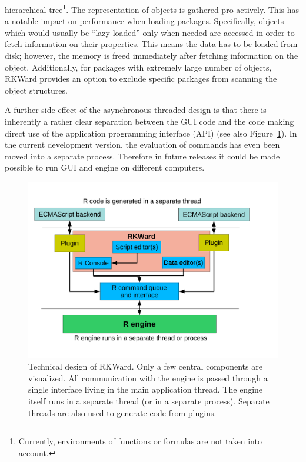 hierarchical tree\footnote{
    Currently, environments of functions or formulas are not taken into account.
}. The representation of  objects is gathered
pro-actively. This has a notable impact on performance when loading packages.
Specifically, objects which would usually be ``lazy loaded'' only when needed \citep[see][]{Ripley2004} are
accessed in order to fetch information on their properties. This means the data
has to be loaded from disk; however, the memory is freed immediately after fetching
information on the object. Additionally, for packages with extremely large number of objects, RKWard
provides an option to exclude specific packages from scanning the object structures.

A further side-effect of the asynchronous threaded design is that there is
inherently a rather clear separation between the GUI code and the code making direct use
of the  application programming interface (API) (see also Figure~\ref{fig:design_sketch}). 
In the current development version, the evaluation
of  commands has even been moved into a separate process. Therefore in future releases it could 
be made possible to run GUI and  engine on different computers.

\begin{figure}[htp]
 \centering
 \includegraphics{../figures/design_sketch.pdf}
 \caption{Technical design of RKWard. Only a few central components are visualized.
 All communication with the  engine is passed through a single interface living in the main application thread. The  engine itself
 runs in a separate thread (or in a separate process). 
 Separate threads are also used to generate  code from plugins.
}
 \label{fig:design_sketch}
\end{figure}

